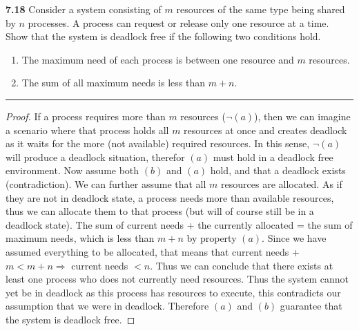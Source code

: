 \documentclass[12pt]{jhwhw}
\begin{document}
\clearpage
\textbf{7.18}  
	Consider a system consisting of $m$ resources of the same type being shared by $n$ processes. A
	process can request or release only one resource at a time. Show that the system is deadlock free
	if the following two conditions hold.
	\begin{enumerate}
		\item The maximum need of each process is between one resource and $m$ resources.
		\item The sum of all maximum needs is less than $m+n$.
	\end{enumerate}
\textcolor[RGB]{240,240,240}{\rule{\textwidth}{0.5pt}}\bigbreak

	\begin{addmargin}[1em]{}
		\begin{proof}

			If a process requires more than $m$ resources ($\neg (a)$), then we can imagine a scenario
			where that process holds all $m$ resources at once and creates deadlock as it waits for
			the more (not available) required resources. In this sense, $\neg (a)$ will produce a 
			deadlock situation, therefor $(a)$ must hold in a deadlock free environment.
			\bigbreak
			Now assume both $(b)$ and $(a)$ hold, and that a deadlock exists (contradiction).
			We can further assume that all $m$ resources are allocated. As if they are not in
			deadlock state, a process needs more than available resources, thus we can allocate
			them to that process (but will of course still be in a deadlock state).
			The sum of current needs + the currently allocated = the sum of maximum needs, which is 
			less than $m + n $ by property $(a)$. Since we have assumed everything to be allocated,
			that means that current needs + $m < m + n \Rightarrow$ current needs $< n$.
			Thus we can conclude that there exists at least one process who does not currently need
			resources. Thus the system cannot yet be in deadlock as this process has resources to execute,
			this contradicts our assumption that we were in deadlock. Therefore $(a)$ and $(b)$ guarantee
			that the system is deadlock free.

		\end{proof}
	\end{addmargin}
\end{document}
